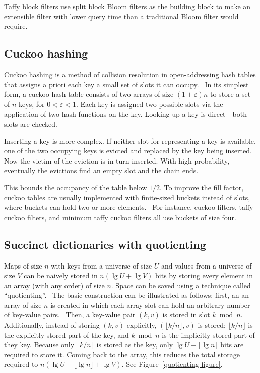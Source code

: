 \documentclass[sigconf, nonacm]{acmart}
\begin{document}
Taffy block filters use split block Bloom filters as the building block to make an extensible filter with lower query time than a traditional Bloom filter would require.

\subsection{Cuckoo hashing}

Cuckoo hashing is a method of collision resolution in open-addressing hash tables that assigns a priori each key a small set of slots it can occupy.~\cite{cuckoo-journal}
In its simplest form, a cuckoo hash table consists of two arrays of size $(1 + \varepsilon)n$ to store a set of $n$ keys, for $0 < \varepsilon < 1$.
Each key is assigned two possible slots via the application of two hash functions on the key.
Looking up a key is direct - both slots are checked.

Inserting a key is more complex.
If neither slot for representing a key is available, one of the two occupying keys is evicted and replaced by the key being inserted.
Now the victim of the eviction is in turn inserted.
With high probability, eventually the evictions find an empty slot and the chain ends.

This bounds the occupancy of the table below $1/2$.
To improve the fill factor, cuckoo tables are usually implemented with finite-sized buckets instead of slots, where buckets can hold two or more elements.~\cite{buckets,load-thresholds}
For instance, cuckoo filters, taffy cuckoo filters, and minimum taffy cuckoo filters all use buckets of size four.~\cite{cuckoo}


\subsection{Succinct dictionaries with quotienting}
\label{quotienting}

Maps of size $n$ with keys from a universe of size $U$ and values from a universe of size $V$ can be naively stored in $n (\lg U + \lg V)$ bits by storing every element in an array (with any order) of size $n$.
Space can be saved using a technique called ``quotienting''.~\cite{knuth,quotient-filter}
The basic construction can be illustrated as follows:
first, an an array of size $n$ is created in which each array slot can hold an arbitrary number of key-value pairs.~\cite{raman-practical}
Then, a key-value pair $(k, v)$ is stored in slot $k \bmod n$.
Additionally, instead of storing $(k, v)$ explicitly, $(\lfloor k / n \rfloor, v)$ is stored; $\lfloor k / n \rfloor$ is the explicitly-stored part of the key, and $k \bmod n$ is the implicitly-stored part of they key.
Because only $\lfloor k / n \rfloor$ is stored as the key, only $\lg U - \lfloor \lg n \rfloor$ bits are required to store it.
Coming back to the array, this reduces the total storage required to $n (\lg U - \lfloor \lg n \rfloor + \lg V)$.
See Figure~\ref{quotienting-figure}.
\end{document}
